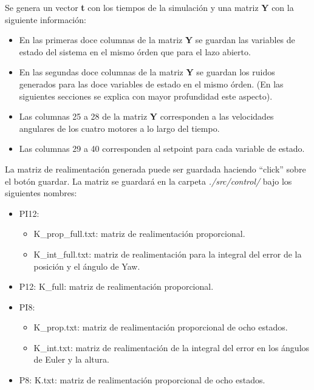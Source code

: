 \documentclass[main]{subfiles}
\begin{document}
Se genera un vector \textbf{t} con los tiempos de la simulaci\'on y una matriz \textbf{Y} con la siguiente informaci\'on:
\begin{itemize}
\item En las primeras doce columnas de la matriz \textbf{Y} se guardan las variables de estado del sistema en el mismo \'orden que para el lazo abierto.
\item En las segundas doce columnas de la matriz \textbf{Y} se guardan los ruidos generados para las doce variables de estado en el mismo \'orden. (En las siguientes secciones se explica con mayor profundidad este aspecto).
\item Las columnas 25 a 28 de la matriz \textbf{Y} corresponden a las velocidades angulares de los cuatro motores a lo largo del tiempo.
\item Las columnas 29 a 40 corresponden al setpoint para cada variable de estado.
\end{itemize}

La matriz de realimentaci\'on generada puede ser guardada haciendo ``click'' sobre el bot\'on guardar. La matriz se guardar\'a en la carpeta \emph{./src/control/} bajo los siguientes nombres:
\begin{itemize}
\item PI12:
	\begin{itemize}
	\item K\_prop\_full.txt: matriz de realimentaci\'on proporcional.
	\item K\_int\_full.txt: matriz de realimentaci\'on para la integral del error de la posici\'on y el \'angulo de Yaw.
	\end{itemize}
\item P12: K\_full: matriz de realimentaci\'on proporcional.
\item PI8:
	\begin{itemize}
	\item K\_prop.txt: matriz de realimentaci\'on proporcional de ocho estados.
	\item K\_int.txt:  matriz de realimentaci\'on de la integral del error en los \'angulos de Euler y la altura.
	\end{itemize}
\item P8: K.txt: matriz de realimentaci\'on proporcional de ocho estados.
\end{itemize}
\end{document}
